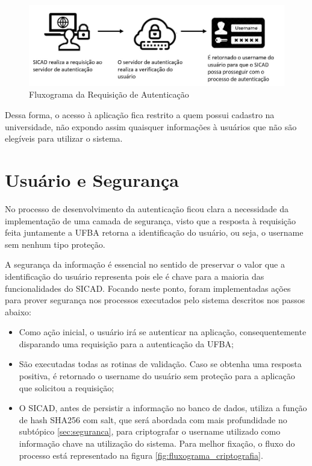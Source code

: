 \documentclass[12pt, a4paper]{report}
\begin{document}
\begin{figure}
\centering
\includegraphics[scale=0.50]{processo_autenticacao.jpg}
\caption{Fluxograma da Requisição de Autenticação}
\label{fig:processo_autenticacao}
\end{figure}

Dessa forma, o acesso à aplicação fica restrito a quem possui cadastro na universidade, não expondo assim quaisquer informações à usuários que não são elegíveis para utilizar o sistema.

\section{Usuário e Segurança}
\label{subsec:userseg}
No processo de desenvolvimento da autenticação ficou clara a necessidade da implementação de uma camada de segurança, visto que a resposta à requisição feita juntamente a \ac{UFBA} retorna a identificação do usuário, ou seja, o username sem nenhum tipo proteção.

A segurança da informação é essencial no sentido de preservar o valor que a identificação do usuário representa pois ele é chave para a maioria das funcionalidades do \ac{SICAD}. Focando neste ponto, foram implementadas ações para prover segurança nos processos executados pelo sistema descritos nos passos abaixo:

\begin{itemize}
\item Como ação inicial, o usuário irá se autenticar na aplicação, consequentemente disparando uma requisição para a autenticação da \ac{UFBA};
\item São executadas todas as rotinas de validação.
Caso se obtenha uma resposta positiva, é retornado o username do usuário sem proteção para a aplicação que solicitou a requisição;
\item O \ac{SICAD}, antes de persistir a informação no banco de dados, utiliza a função de hash SHA256 com salt, que será abordada com mais profundidade no subtópico \ref{sec:seguranca}, para criptografar o username utilizado como informação chave na utilização do sistema. Para melhor fixação, o fluxo do processo está representado na figura \ref{fig:fluxograma_criptografia}.
\end{itemize}
\end{document}
